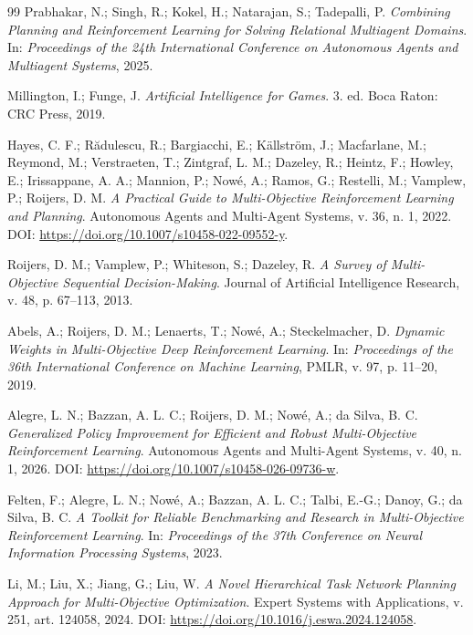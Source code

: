 \begin{thebibliography}{99}
Prabhakar, N.; Singh, R.; Kokel, H.; Natarajan, S.; Tadepalli, P.
\textit{Combining Planning and Reinforcement Learning for Solving Relational
Multiagent Domains}.
In: \textit{Proceedings of the 24th International Conference on Autonomous
Agents and Multiagent Systems}, 2025.

Millington, I.; Funge, J.
\textit{Artificial Intelligence for Games}.
3. ed. Boca Raton: CRC Press, 2019.

Hayes, C. F.; Rădulescu, R.; Bargiacchi, E.; Källström, J.; Macfarlane, M.;
Reymond, M.; Verstraeten, T.; Zintgraf, L. M.; Dazeley, R.; Heintz, F.;
Howley, E.; Irissappane, A. A.; Mannion, P.; Nowé, A.; Ramos, G.; Restelli, M.;
Vamplew, P.; Roijers, D. M.
\textit{A Practical Guide to Multi-Objective Reinforcement Learning and
Planning}.
Autonomous Agents and Multi-Agent Systems, v. 36, n. 1, 2022.
DOI: \url{https://doi.org/10.1007/s10458-022-09552-y}.

Roijers, D. M.; Vamplew, P.; Whiteson, S.; Dazeley, R.
\textit{A Survey of Multi-Objective Sequential Decision-Making}.
Journal of Artificial Intelligence Research, v. 48,
p. 67--113, 2013.


Abels, A.; Roijers, D. M.; Lenaerts, T.; Nowé, A.; Steckelmacher, D.
\textit{Dynamic Weights in Multi-Objective Deep Reinforcement Learning}.
In: \textit{Proceedings of the 36th International Conference on Machine
Learning}, PMLR, v. 97, p. 11--20, 2019.

Alegre, L. N.; Bazzan, A. L. C.; Roijers, D. M.; Nowé, A.; da Silva, B. C.
\textit{Generalized Policy Improvement for Efficient and Robust
Multi-Objective Reinforcement Learning}.
Autonomous Agents and Multi-Agent Systems, v. 40, n. 1, 2026.
DOI: \url{https://doi.org/10.1007/s10458-026-09736-w}.

Felten, F.; Alegre, L. N.; Nowé, A.; Bazzan, A. L. C.; Talbi, E.-G.;
Danoy, G.; da Silva, B. C.
\textit{A Toolkit for Reliable Benchmarking and Research in
Multi-Objective Reinforcement Learning}.
In: \textit{Proceedings of the 37th Conference on Neural Information
Processing Systems}, 2023.

Li, M.; Liu, X.; Jiang, G.; Liu, W.
\textit{A Novel Hierarchical Task Network Planning Approach for Multi-Objective
Optimization}.
Expert Systems with Applications, v. 251, art. 124058, 2024.
DOI: \url{https://doi.org/10.1016/j.eswa.2024.124058}.


\end{thebibliography}
